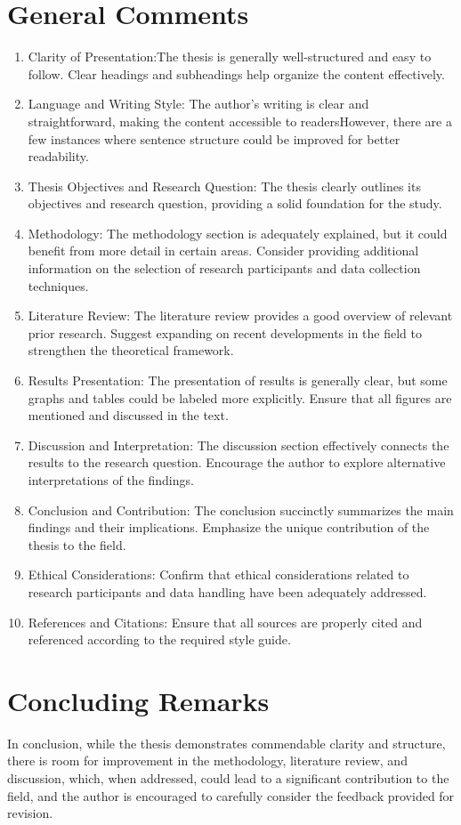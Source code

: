 \documentclass[11pt]{article}
\begin{document}
\section{General Comments}
\begin{enumerate}
    \item Clarity of Presentation:The thesis is generally well-structured and easy to follow. Clear headings and subheadings help organize the content effectively.
    \item Language and Writing Style: The author's writing is clear and straightforward, making the content accessible to readersHowever, there are a few instances where sentence structure could be improved for better readability.
    \item Thesis Objectives and Research Question: The thesis clearly outlines its objectives and research question, providing a solid foundation for the study.
    \item Methodology: The methodology section is adequately explained, but it could benefit from more detail in certain areas. Consider providing additional information on the selection of research participants and data collection techniques.
    \item Literature Review: The literature review provides a good overview of relevant prior research. Suggest expanding on recent developments in the field to strengthen the theoretical framework.
    \item Results Presentation: The presentation of results is generally clear, but some graphs and tables could be labeled more explicitly. Ensure that all figures are mentioned and discussed in the text.
    \item Discussion and Interpretation: The discussion section effectively connects the results to the research question. Encourage the author to explore alternative interpretations of the findings.
    \item Conclusion and Contribution: The conclusion succinctly summarizes the main findings and their implications. Emphasize the unique contribution of the thesis to the field.
    \item Ethical Considerations: Confirm that ethical considerations related to research participants and data handling have been adequately addressed.
    \item References and Citations: Ensure that all sources are properly cited and referenced according to the required style guide.
\end{enumerate}


\section{Concluding Remarks}
In conclusion, while the thesis demonstrates commendable clarity and structure, there is room for improvement in the methodology, literature review, and discussion, which, when addressed, could lead to a significant contribution to the field, and the author is encouraged to carefully consider the feedback provided for revision.
\end{document}

